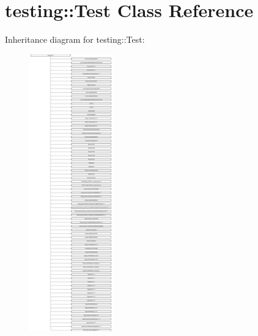 \hypertarget{classtesting_1_1Test}{}\section{testing\+:\+:Test Class Reference}
\label{classtesting_1_1Test}
Inheritance diagram for testing\+:\+:Test\+:\begin{figure}[H]
\begin{center}
\leavevmode
\includegraphics[height=12.000000cm]{classtesting_1_1Test}
\end{center}
\end{figure}
